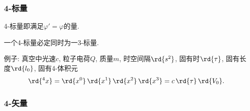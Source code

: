 \documentclass[hidelinks]{ctexart}
\begin{document}
\subsubsection{4-标量} %
\label{ssub:4_标量}

4-标量即满足$\varphi' = \varphi$的量.
\begin{cenum}
    \item 一个4-标量必定同时为一3-标量.
    \item 例子: 真空中光速$c$, 粒子电荷$Q$, 质量$m$, 时空间隔$\rd{s^2}$, 固有时$\rd{\tau}$, 固有长度$\rd{l_0}$, 固有4-体积元
    \[ \rd{^4x} = \rd{x^0}\,\rd{x^1}\,\rd{x^2}\,\rd{x^3} = c\,\rd{\tau}\,\rd{V_0}. \]
\end{cenum}


\subsubsection{4-矢量} %
\label{ssub:4_矢量}
\end{document}
